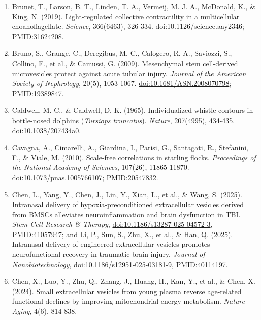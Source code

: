 \documentclass[10pt,letterpaper]{article}
\begin{document}
\begin{enumerate}
  \emph{Nature Communications}.
  \href{https://doi.org/10.1038/s41467-026-76113-2}{doi:10.1038/s41467-026-76113-2};
  \url{PMID:42613335}.
\item
  Brunet, T., Larson, B. T., Linden, T. A., Vermeij, M. J. A., McDonald,
  K., \& King, N. (2019). Light-regulated collective contractility in a
  multicellular choanoflagellate. \emph{Science}, 366(6463), 326-334.
  \href{https://doi.org/10.1126/science.aay2346}{doi:10.1126/science.aay2346};
  \url{PMID:31624208}.
\item
  Bruno, S., Grange, C., Deregibus, M. C., Calogero, R. A., Saviozzi,
  S., Collino, F., et al., \& Camussi, G. (2009). Mesenchymal stem
  cell-derived microvesicles protect against acute tubular injury.
  \emph{Journal of the American Society of Nephrology}, 20(5),
  1053-1067.
  \href{https://doi.org/10.1681/ASN.2008070798}{doi:10.1681/ASN.2008070798};
  \url{PMID:19389847}.
\item
  Caldwell, M. C., \& Caldwell, D. K. (1965). Individualized whistle
  contours in bottle-nosed dolphins (\emph{Tursiops truncatus}).
  \emph{Nature}, 207(4995), 434-435.
  \href{https://doi.org/10.1038/207434a0}{doi:10.1038/207434a0}.
\item
  Cavagna, A., Cimarelli, A., Giardina, I., Parisi, G., Santagati, R.,
  Stefanini, F., \& Viale, M. (2010). Scale-free correlations in
  starling flocks. \emph{Proceedings of the National Academy of
  Sciences}, 107(26), 11865-11870.
  \href{https://doi.org/10.1073/pnas.1005766107}{doi:10.1073/pnas.1005766107};
  \url{PMID:20547832}.
\item
  Chen, L., Yang, Y., Chen, J., Lin, Y., Xian, L., et al., \& Wang, S.
  (2025). Intranasal delivery of hypoxia-preconditioned extracellular
  vesicles derived from BMSCs alleviates neuroinflammation and brain
  dysfunction in TBI. \emph{Stem Cell Research \& Therapy},
  \href{https://doi.org/10.1186/s13287-025-04572-3}{doi:10.1186/s13287-025-04572-3},
  \url{PMID:41057947}; and Li, P., Sun, S., Zhu, X., et al., \& Han, Q.
  (2025). Intranasal delivery of engineered extracellular vesicles
  promotes neurofunctional recovery in traumatic brain injury.
  \emph{Journal of Nanobiotechnology},
  \href{https://doi.org/10.1186/s12951-025-03181-9}{doi:10.1186/s12951-025-03181-9},
  \url{PMID:40114197}.
\item
  Chen, X., Luo, Y., Zhu, Q., Zhang, J., Huang, H., Kan, Y., et al., \&
  Chen, X. (2024). Small extracellular vesicles from young plasma
  reverse age-related functional declines by improving mitochondrial
  energy metabolism. \emph{Nature Aging}, 4(6), 814-838.

\end{enumerate}
\end{document}
